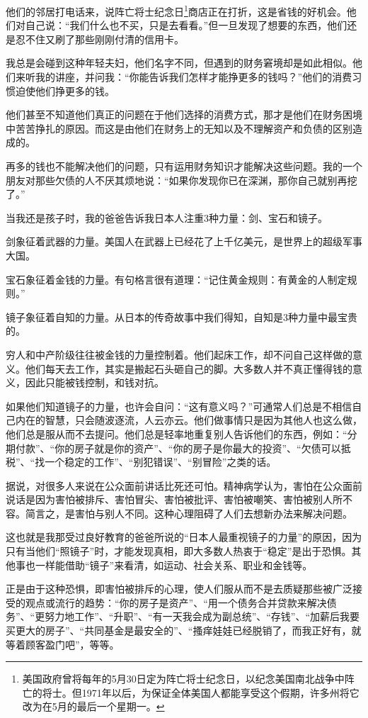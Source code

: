 他们的邻居打电话来，说阵亡将士纪念日\footnote{美国政府曾将每年的5月30日定为阵亡将士纪念日，以纪念美国南北战争中阵亡的将士。但1971年以后，为保证全体美国人都能享受这个假期，许多州将它改为在5月的最后一个星期一。}商店正在打折，这是省钱的好机会。他们对自己说：“我们什么也不买，只是去看看。”但一旦发现了想要的东西，他们还是忍不住又刷了那些刚刚付清的信用卡。

我总是会碰到这种年轻夫妇，他们名字不同，但遇到的财务窘境却是如此相似。他们来听我的讲座，并问我：“你能告诉我们怎样才能挣更多的钱吗？”他们的消费习惯迫使他们挣更多的钱。

他们甚至不知道他们真正的问题在于他们选择的消费方式，那才是他们在财务困境中苦苦挣扎的原因。而这是由他们在财务上的无知以及不理解资产和负债的区别造成的。

再多的钱也不能解决他们的问题，只有运用财务知识才能解决这些问题。我的一个朋友对那些欠债的人不厌其烦地说：“如果你发现你已在深渊，那你自己就别再挖了。”

当我还是孩子时，我的爸爸告诉我日本人注重3种力量：剑、宝石和镜子。

剑象征着武器的力量。美国人在武器上已经花了上千亿美元，是世界上的超级军事大国。

宝石象征着金钱的力量。有句格言很有道理：“记住黄金规则：有黄金的人制定规则。”

镜子象征着自知的力量。从日本的传奇故事中我们得知，自知是3种力量中最宝贵的。

穷人和中产阶级往往被金钱的力量控制着。他们起床工作，却不问自己这样做的意义。他们每天去工作，其实是搬起石头砸自己的脚。大多数人并不真正懂得钱的意义，因此只能被钱控制，和钱对抗。

如果他们知道镜子的力量，也许会自问：“这有意义吗？”可通常人们总是不相信自己内在的智慧，只会随波逐流，人云亦云。他们做事情只是因为其他人也这么做，他们总是服从而不去提问。他们总是轻率地重复别人告诉他们的东西，例如：“分期付款”、“你的房子就是你的资产”、“你的房子是你最大的投资”、“欠债可以抵税”、“找一个稳定的工作”、“别犯错误”、“别冒险”之类的话。

据说，对很多人来说在公众面前讲话比死还可怕。精神病学认为，害怕在公众面前说话是因为害怕被排斥、害怕冒尖、害怕被批评、害怕被嘲笑、害怕被别人所不容。简言之，是害怕与别人不同。这种心理阻碍了人们去想新办法来解决问题。

这也就是我那受过良好教育的爸爸所说的“日本人最重视镜子的力量”的原因，因为只有当他们“照镜子”时，才能发现真相，即大多数人热衷于“稳定”是出于恐惧。其他事也一样能借助“镜子”来看清，如运动、社会关系、职业和金钱等。

正是由于这种恐惧，即害怕被排斥的心理，使人们服从而不是去质疑那些被广泛接受的观点或流行的趋势：“你的房子是资产”、“用一个债务合并贷款来解决债务”、“更努力地工作”、“升职”、“有一天我会成为副总统”、“存钱”、“加薪后我要买更大的房子”、“共同基金是最安全的”、“搔痒娃娃已经脱销了，而我正好有，就等着顾客盈门吧”，等等。


